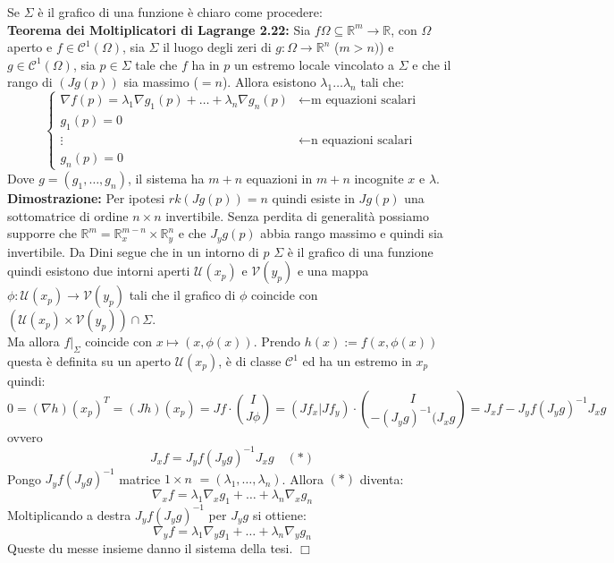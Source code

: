 \documentclass[a4paper,11pt,titlepage]{book}
\begin{document}
Se $\Sigma$ è il grafico di una funzione è chiaro come procedere:\\

\textbf{Teorema dei Moltiplicatori di Lagrange 2.22:} Sia $f\Omega\subseteq\mathbb{R}^m\to\mathbb{R}$, con $\Omega$ aperto e $f\in\mathcal{C}^1(\Omega)$, sia $\Sigma$ il luogo degli zeri di $g:\Omega\to\mathbb{R}^n$ ($m>n)$) e $g\in\mathcal{C}^1(\Omega)$, sia $p\in\Sigma$ tale che $f$ ha in $p$ un estremo locale vincolato a $\Sigma$ e che il rango di $(Jg(p))$ sia massimo ($=n$). Allora esistono $\lambda_1\ldots\lambda_n$ tali che: $$\begin{cases} \nabla f(p)=\lambda_1\nabla g_1(p)+\ldots+\lambda_n\nabla g_n(p) & \leftarrow\mbox{m equazioni scalari}\\ g_1(p)=0\\ \vdots  &  \leftarrow\mbox{n equazioni scalari} \\ g_n(p)=0
\end{cases}$$ Dove $g=(g_1,\ldots,g_n)$, il sistema ha $m+n$ equazioni in $m+n$ incognite $x$ e $\lambda$.\\

\textbf{Dimostrazione:} Per ipotesi $rk(Jg(p))=n$ quindi esiste in $Jg(p)$ una sottomatrice di ordine $n\times n$ invertibile. Senza perdita di generalità possiamo supporre che $\mathbb{R}^m=\mathbb{R}_x^{m-n}\times\mathbb{R}_y^n$ e che $J_yg(p)$ abbia rango massimo e quindi sia invertibile. Da Dini segue che in un intorno di $p$ $\Sigma$ è il grafico di una funzione quindi esistono due intorni aperti $\mathcal{U}(x_p)$ e $\mathcal{V}(y_p)$ e una mappa $\phi:\mathcal{U}(x_p)\to\mathcal{V}(y_p)$ tali che il grafico di $\phi$ coincide con $(\mathcal{U}(x_p)\times\mathcal{V}(y_p))\cap\Sigma$. \\

Ma allora $f|_\Sigma$ coincide con $x\mapsto (x,\phi(x))$. Prendo $h(x):=f(x,\phi(x))$ questa è definita su un aperto $\mathcal{U}(x_p)$, è di classe $\mathcal{C}^1$ ed ha un estremo in $x_p$ quindi: $$0=(\nabla h)(x_p)^T=(Jh)(x_p)=Jf\cdot\binom{I}{J\phi}=(Jf_x|Jf_y)\cdot\binom{I}{-(J_yg)^{-1}(J_xg}=J_xf-J_yf(J_yg)^{-1}J_xg$$ ovvero $$J_xf=J_yf(J_yg)^{-1}J_xg\quad(*)$$ Pongo $J_yf(J_yg)^{-1}$ matrice $1\times n$ $=(\lambda_1,\ldots,\lambda_n)$. Allora $(*)$ diventa: $$\nabla_xf=\lambda_1\nabla_xg_1+\ldots+\lambda_n\nabla_xg_n$$ Moltiplicando a destra $J_yf(J_yg)^{-1}$ per $J_yg$ si ottiene: $$\nabla_yf=\lambda_1\nabla_yg_1+\ldots+\lambda_n\nabla_yg_n$$ Queste du messe insieme danno il sistema della tesi. $\Box$\\
\end{document}
